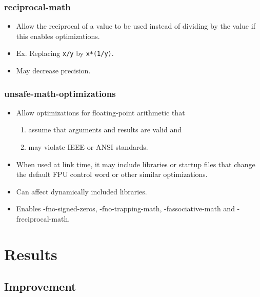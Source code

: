 \documentclass{beamer}
\begin{document}
\begin{frame}[fragile]
    \frametitle{reciprocal-math}

    \begin{itemize}
        \item Allow the reciprocal of a value to be used instead of dividing by the value if this enables optimizations.
        \item Ex. Replacing \verb'x/y' by \verb'x*(1/y)'.
        \item May decrease precision.
    \end{itemize}
\end{frame}

\begin{frame}[fragile]
    \frametitle{unsafe-math-optimizations}

    \begin{itemize}
        \item Allow optimizations for floating-point arithmetic that
              \begin{enumerate}
                  \item assume that arguments and results are valid and
                  \item may violate IEEE or ANSI standards.
              \end{enumerate}
        \item When used at link time, it may include libraries or startup files that change the default FPU control word or other similar optimizations.
        \item Can affect dynamically included libraries.
        \item Enables -fno-signed-zeros, -fno-trapping-math, -fassociative-math and -freciprocal-math.
    \end{itemize}
\end{frame}

\section{Results}

\begin{frame}
    \tableofcontents[currentsection]
\end{frame}

\subsection{Improvement}
\end{document}
